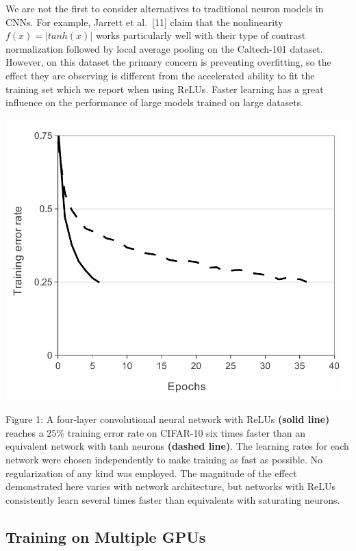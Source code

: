 \documentclass[12pt,a4paper,UTF8,twoside]{book}
\begin{document}
We are not the first to consider alternatives to traditional neuron models in CNNs. For example, Jarrett et al.~{[}11{]} claim that the nonlinearity \(f(x) = |tanh(x)|\) works particularly well with their type of contrast normalization followed by local average pooling on the Caltech-101 dataset. However, on this dataset the primary concern is preventing overfitting, so the effect they are observing is different from the accelerated ability to fit the training set which we report when using ReLUs. Faster learning has a great influence on the performance of large models trained on large datasets.

\begin{center}\includegraphics[width=0.7\linewidth]{img/01-01} \end{center}

Figure 1: A four-layer convolutional neural network with ReLUs \textbf{(solid line)} reaches a 25\% training error rate on CIFAR-10 six times faster than an equivalent network with tanh neurons \textbf{(dashed line)}. The learning rates for each network were chosen independently to make training as fast as possible. No regularization of any kind was employed. The magnitude of the effect demonstrated here varies with network architecture, but networks with ReLUs consistently learn several times faster than equivalents with saturating neurons.

\hypertarget{training-on-multiple-gpus}{%
\subsection{Training on Multiple GPUs}\label{training-on-multiple-gpus}}
\end{document}
